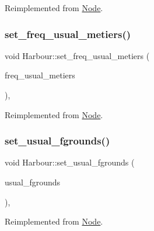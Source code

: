 Reimplemented from \mbox{\hyperlink{class_node_af7f54afbacab1aae936436ea2ee029f0}{Node}}.

\mbox{\label{class_harbour_a9c91424f1d691474c5db9b55a90dc2e6}} 
\subsubsection{\texorpdfstring{set\_freq\_usual\_metiers()}{set\_freq\_usual\_metiers()}}
{\footnotesize\ttfamily void Harbour\+::set\+\_\+freq\+\_\+usual\+\_\+metiers (\begin{DoxyParamCaption}\item[{multimap$<$ int, double $>$}]{freq\+\_\+usual\+\_\+metiers }\end{DoxyParamCaption})\hspace{0.3cm}{\ttfamily [override]}, {\ttfamily [virtual]}}



Reimplemented from \mbox{\hyperlink{class_node_a7f782a14dbabf4b50a30a89e3d686869}{Node}}.

\mbox{\label{class_harbour_a00ab27f3f0044f640da591821c735310}} 
\subsubsection{\texorpdfstring{set\_usual\_fgrounds()}{set\_usual\_fgrounds()}}
{\footnotesize\ttfamily void Harbour\+::set\+\_\+usual\+\_\+fgrounds (\begin{DoxyParamCaption}\item[{const vector$<$ \mbox{\hyperlink{classtypes_1_1_node_id}{types\+::\+Node\+Id}} $>$ \&}]{usual\+\_\+fgrounds }\end{DoxyParamCaption})\hspace{0.3cm}{\ttfamily [override]}, {\ttfamily [virtual]}}



Reimplemented from \mbox{\hyperlink{class_node_af8df7f4ea7508b5fc9188af822ba363d}{Node}}.

\mbox{\label{class_harbour_a27f372be53f0c5b8ed44e9eaf7377209}} 
